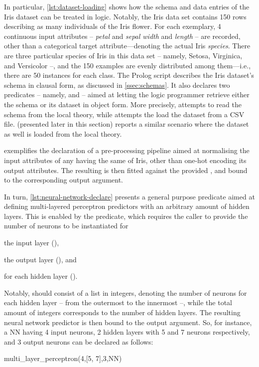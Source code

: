 \documentclass[runningheads]{llncs}
\begin{document}
In particular, \cref{lst:dataset-loading} shows how the schema and data entries of the Iris dataset can be treated in logic.
%
Notably, the Iris data set contains 150 rows describing as many individuals of the Iris flower.
%
For each exemplary, 4 continuous input attributes -- \emph{petal} and \emph{sepal width} and \emph{length} -- are recorded, other than a categorical target attribute---denoting the actual Iris \emph{species}.
%
There are three particular species of Iris in this data set -- namely, Setosa, Virginica, and Versicolor --, and the 150 examples are evenly distributed among them---i.e., there are 50 instances for each class.
%
The Prolog script describes the Iris dataset's schema in clausal form, as discussed in \cref{ssec:schemas}.
%
It also declares two predicates -- namely,  and  -- aimed at letting the logic programmer retrieve either the schema or its dataset in object form.
%
More precisely,  attempts to read the schema from the local theory, while  attempts the load the dataset from a CSV file.
%
 (presented later in this section) reports a similar scenario where the dataset as well is loaded from the local theory.

 exemplifies the declaration of a pre-processing pipeline aimed at normalising the input attributes of any  having the same  of Iris, other than one-hot encoding its output attributes.
%
The resulting  is then fitted against the provided , and bound to the corresponding output argument.

In turn, \cref{lst:neural-network-declare} presents a general purpose predicate aimed at defining multi-layered perceptron predictors with an arbitrary amount of hidden layers.
%
This is enabled by the  predicate, which requires the caller to provide the number of neurons to be instantiated for
%
\begin{inlinelist}
    \item the input layer (),
    \item the output layer (), and
    \item for each hidden layer ().
\end{inlinelist}
%
Notably,  should consist of a list in integers, denoting the number of neurons for each hidden layer -- from the outermost to the innermost --, while the total amount of integers corresponds to the number of hidden layers.
%
The resulting neural network predictor is then bound to the  output argument.
%
So, for instance, a NN having 4 input neurons, 2 hidden layers with 5 and 7 neurons respectively, and 3 output neurons can be declared as follows:
%
\begin{lp}
    multi\_layer\_perceptron(4,[5, 7],3,NN)
\end{lp}
\end{document}

